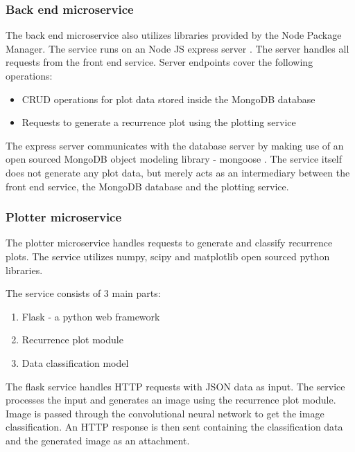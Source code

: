 \documentclass[a4paper,12pt,fleqn]{article}
\begin{document}
\subsubsection{Back end microservice}
The back end microservice also utilizes libraries provided by the Node Package Manager.
The service runs on an Node JS express server \cite{express}.
The server handles all requests from the front end service.
Server endpoints cover the following operations:
\begin{itemize}
  \item CRUD operations for plot data stored inside the MongoDB database
  \item Requests to generate a recurrence plot using the plotting service
\end{itemize}
The express server communicates with the database server by making use of an open sourced MongoDB object modeling library - mongoose \cite{mongoose}.
The service itself does not generate any plot data, but merely acts as an intermediary between the front end service, the MongoDB database and the plotting service.


\subsubsection{Plotter microservice}
\label{sec:plotter_microservice}
The plotter microservice handles requests to generate and classify recurrence plots.
The service utilizes numpy\cite{numpy}, scipy\cite{scipy} and matplotlib\cite{matplotlib} open sourced python libraries.

The service consists of 3 main parts:
\begin{enumerate}
  \item Flask - a python web framework
  \item Recurrence plot module
  \item Data classification model
\end{enumerate}
The flask service handles HTTP requests with JSON data as input.
The service processes the input and generates an image using the recurrence plot module.
Image is passed through the convolutional neural network to get the image classification.
An HTTP response is then sent containing the classification data and the generated image as an attachment.


\end{document}
